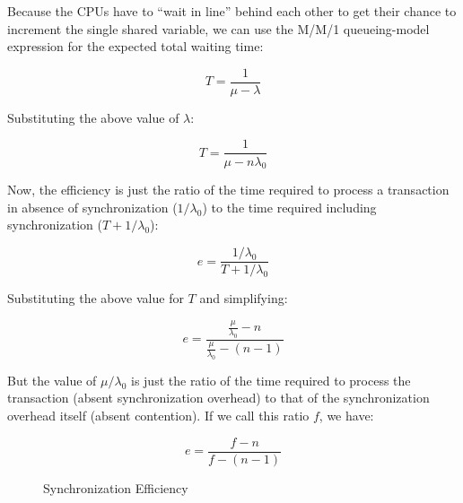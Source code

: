 Because the CPUs have to ``wait in line'' behind each other to get their
chance to increment the single shared variable, we can use the M/M/1
queueing-model expression for the expected total waiting time:

\begin{equation}
	T = \frac{1}{\mu - \lambda}
\end{equation}

Substituting the above value of $\lambda$:

\begin{equation}
	T = \frac{1}{\mu - n \lambda_0}
\end{equation}

Now, the efficiency is just the ratio of the time required to process
a transaction in absence of synchronization ($1 / \lambda_0$)
to the time required including synchronization ($T + 1 / \lambda_0$):

\begin{equation}
	e = \frac{1 / \lambda_0}{T + 1 / \lambda_0}
\end{equation}

Substituting the above value for $T$ and simplifying:

\begin{equation}
	e = \frac{\frac{\mu}{\lambda_0} - n}{\frac{\mu}{\lambda_0} - (n - 1)}
\end{equation}

But the value of $\mu / \lambda_0$ is just the ratio of the time required
to process the transaction (absent synchronization overhead) to that of
the synchronization overhead itself (absent contention).
If we call this ratio $f$, we have:

\begin{equation}
	e = \frac{f - n}{f - (n - 1)}
\end{equation}

\begin{figure}[tbp]
\centering
{}
\caption{Synchronization Efficiency}
\label{fig:SMPdesign:Synchronization Efficiency}
\end{figure}

